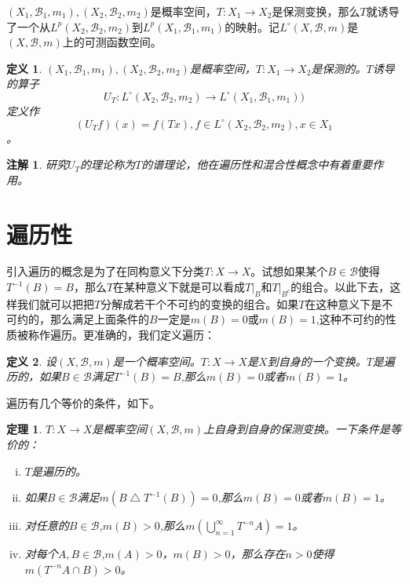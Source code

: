 \documentclass[a4paper,11pt,oneside]{book}
\newtheorem{theorem}{\textbf{\hspace{0.7cm}定理}}[section]
\newtheorem{definition}{\textbf{\hspace{0.7cm}定义}}[section]
\newtheorem{remark}{\textbf{\hspace{0.7cm}注解}}[section]
\newcommand{\ms}[1]{\mathscr{#1}}
\begin{document}
$(X_1,\mathscr{B}_1,m_1),(X_2,\mathscr{B}_2,m_2)$是概率空间，$T:X_1 \rightarrow X_2$是保测变换，那么$T$就诱导了一个从$L^p(X_2,\mathscr{B}_2,m_2)$到$L^p(X_1,\mathscr{B}_1,m_1)$的映射。记$L^{\circ}(X,\ms{B},m)$是$(X,\ms{B},m)$上的可测函数空间。

\begin{definition}
$(X_1,\mathscr{B}_1,m_1),(X_2,\mathscr{B}_2,m_2)$是概率空间，$T:X_1 \rightarrow X_2$是保测的。$T$诱导的算子$$U_T:L^{\circ}(X_2,\ms{B}_2,m_2)\rightarrow L^{\circ}(X_1,\ms{B}_1,m_1))$$定义作$$(U_Tf)(x)=f(Tx),f\in L^{\circ}(X_2,\ms{B}_2,m_2),x\in X_1$$。

\end{definition}
\begin{remark}
研究$U_T$的理论称为$T$的谱理论，他在遍历性和混合性概念中有着重要作用。
\end{remark}



\section{遍历性}
引入遍历的概念是为了在同构意义下分类$T:X \rightarrow X$。试想如果某个$B\in\ms{B}$使得$T^{-1}(B)=B$，那么$T$在某种意义下就是可以看成$T|_B$和$T|_{B^{c}}$的组合。以此下去，这样我们就可以把把$T$分解成若干个不可约的变换的组合。如果$T$在这种意义下是不可约的，那么满足上面条件的$B$一定是$m(B)=0$或$m(B)=1$,这种不可约的性质被称作遍历。更准确的，我们定义遍历：

\begin{definition}
设$(X,\ms{B},m)$是一个概率空间。$T:X \rightarrow X$是$X$到自身的一个变换。$T$是遍历的，如果$B\in\ms B $满足$T^{-1}(B)=B$,那么$m(B)=0$或者$m(B)=1$。
\end{definition}

遍历有几个等价的条件，如下。
\begin{theorem}
$T:X \rightarrow X$是概率空间$(X,\ms{B},m)$上自身到自身的保测变换。一下条件是等价的：
\begin{enumerate}[(i)]
\item $T$是遍历的。
\item 如果$B\in\ms B$满足$m(B\bigtriangleup T^{-1}(B))=0$,那么$m(B)=0$或者$m(B)=1$。
\item 对任意的$B\in\ms B$,$m(B)>0$,那么$m(\bigcup_{n=1}^{\infty}T^{-n}A)=1$。
\item 对每个$A,B\in\ms B$,$m(A)>0$，$m(B)>0$，那么存在$n>0$使得$m(T^{-n}A\cap B)>0$。
\end{enumerate}
\end{theorem}
\end{document}
